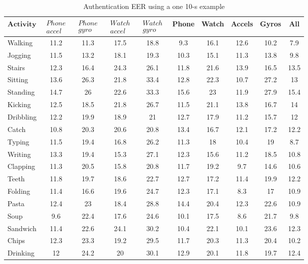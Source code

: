 \documentclass{IJFS}
\begin{document}
\begin{table}[htbp]\footnotesize{
\begin{center}\caption{Authentication EER using a one 10-s example \label{rt}}
\begin{tabular}{l| c| c| c|  c| c| c| c|c|  c} \hline
$\textbf{Activity}$  & $\begin{array}{l} Phone\\accel
\end{array}$ & $\begin{array}{l} Phone\\gyro
\end{array}$ & $\begin{array}{l} Watch\\accel
\end{array}$& $\begin{array}{l} Watch\\gyro
\end{array}$& Phone & Watch & Accels& Gyros& All\\
\hline Walking &11.2 & 11.3 & 17.5& 18.8 & 9.3 & 16.1 & 12.6 & 10.2 & 7.9 \\
Jogging & 11.5 & 13.2 & 18.1 & 19.3 & 10.3 & 15.1 & 11.3 & 13.8 & 9.8\\
Stairs &  12.3 &
16.4&24.3&26.1&11.8&21.6&13.9&16.5&13.5\\
Sitting & 13.6 &26.3&21.8&33.4&12.8&22.3&10.7&27.2&13\\ 
Standing &14.7 & 26& 22.6 & 33.3 & 15.6 & 23& 11.9 & 27.9 &15.4 \\ 
Kicking &12.5 & 18.5 & 21.8 & 26.7 & 11.5 & 21.1& 13.8 & 16.7& 14 \\
Dribbling & 12.2 & 19.9 & 18.9 & 21 & 12.7 & 17.9 & 11.2 & 15.7 &12\\
Catch &10.8 & 20.3 & 20.6 & 20.8 & 13.4 & 16.7 & 12.1 & 17.2 & 12.2\\
Typing & 11.5 & 19.4 & 16.8 & 26.2& 11.3 & 18 & 10.4 & 19 & 8.7\\
Writing &13.3 &19.4&15.3&27.1&12.3&15.6&11.2&18.5&10.8\\ 
Clapping & 11.3 & 20.5 & 15.8 & 20.8 & 11.7 & 19.2 & 9.7 & 14.6 & 10.6\\
Teeth & 11.8 & 19.7 & 18.6 & 22.7 & 12.7 & 17.2 & 11.4 & 19.9 &12.2\\
Folding & 11.4 & 16.6 & 19.6 & 24.7 & 12.3 & 17.1 & 8.3 & 17 & 10.9\\
Pasta & 12.4 & 23 & 18.4 & 28.8 & 14.4 & 20.4 & 12.3 & 22.6 & 10.9\\
Soup & 9.6 & 22.4 & 17.6 & 24.6 & 10.1 & 17.5 & 8.6 & 21.7 & 9.8\\
Sandwich & 11.4 & 22.6 & 24.1 & 30.2 & 10.4 & 22.1 & 10.1 & 23.6 & 12.3 \\
Chips & 12.3 & 23.3 & 19.2 & 29.5 & 11.7 & 20.3  &  11.3 & 20.4 &
10.2\\
Drinking &12 &  24.2 & 20 & 30.1 & 12.9 & 20.1 & 11.8 &  19.7 & 12.4 \\
\hline
\end{tabular}\end{center}}
\end{table}
\end{document}
